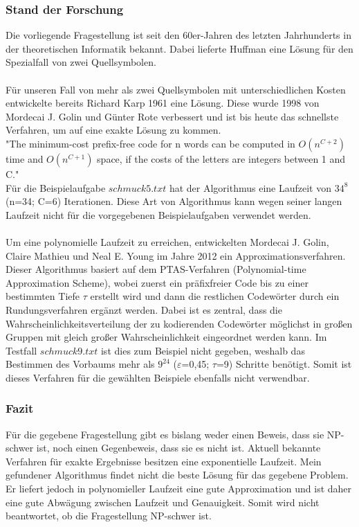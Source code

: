 \documentclass[a4paper,12pt,ngerman]{scrartcl}
\begin{document}
\subsubsection{Stand der Forschung}
Die vorliegende Fragestellung ist seit den 60er-Jahren des letzten Jahrhunderts in der theoretischen Informatik bekannt. 
Dabei lieferte Huffman eine Lösung für den Spezialfall von zwei Quellsymbolen.\cite[S. 39]{schulz2018codierungstheorie}
\\
\\
Für unseren Fall von mehr als zwei Quellsymbolen mit unterschiedlichen Kosten entwickelte bereits Richard Karp 1961 eine Lösung.\cite{karp1961minimum}
Diese wurde 1998 von Mordecai J. Golin und Günter Rote verbessert und ist bis heute das schnellste Verfahren, um auf eine exakte Lösung zu kommen.\cite{golin1998prefixfree}\\
"The minimum-cost prefix-free code for n words can be computed in $O(n^{C+2})$ time and $O(n^{C+1})$ space, if the costs of the letters are integers between 1 and C."\cite[S. 20]{golin1998prefixfree}\\
Für die Beispielaufgabe $schmuck5.txt$ \cite{bwinf_website} hat der Algorithmus eine Laufzeit von $34^8$(n=34; C=6) Iterationen. 
Diese Art von Algorithmus kann wegen seiner langen Laufzeit nicht für die vorgegebenen Beispielaufgaben verwendet werden.
\\
\\
Um eine polynomielle Laufzeit zu erreichen, entwickelten Mordecai J. Golin, Claire Mathieu und Neal E. Young im Jahre 2012 ein Approximationsverfahren.\\
Dieser Algorithmus basiert auf dem PTAS-Verfahren (Polynomial-time Approximation Scheme), wobei zuerst ein präfixfreier Code bis zu einer bestimmten Tiefe $\tau$ erstellt wird und dann die restlichen Codewörter durch ein Rundungsverfahren ergänzt werden.
Dabei ist es zentral, dass die Wahrscheinlichkeitsverteilung der zu kodierenden Codewörter möglichst in großen Gruppen mit gleich großer Wahrscheinlichkeit eingeordnet werden kann.\cite{golin2012huffman}
Im Testfall $schmuck9.txt$ \cite{bwinf_website} ist dies zum Beispiel nicht gegeben, weshalb das Bestimmen des Vorbaums mehr als $9^{24}$ ($\varepsilon$=0,45; $\tau$=9) Schritte benötigt.
Somit ist dieses Verfahren für die gewählten Beispiele ebenfalls nicht verwendbar.

\subsubsection{Fazit}
Für die gegebene Fragestellung gibt es bislang weder einen Beweis, dass sie NP-schwer ist, noch einen Gegenbeweis, dass sie es nicht ist.
Aktuell bekannte Verfahren für exakte Ergebnisse besitzen eine exponentielle Laufzeit.\cite{golin1998prefixfree}
Mein gefundener Algorithmus findet nicht die beste Lösung für das gegebene Problem. Er liefert jedoch in polynomieller Laufzeit eine gute Approximation
und ist daher eine gute Abwägung zwischen Laufzeit und Genauigkeit.
Somit wird nicht beantwortet, ob die Fragestellung NP-schwer ist.
\end{document}
